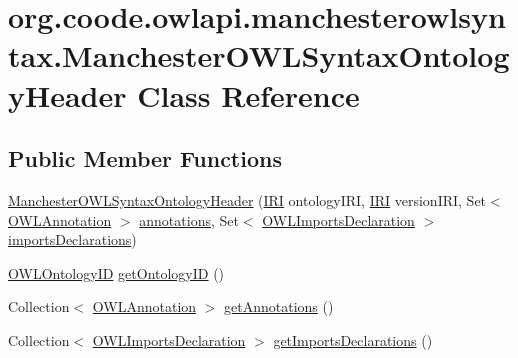 \hypertarget{classorg_1_1coode_1_1owlapi_1_1manchesterowlsyntax_1_1_manchester_o_w_l_syntax_ontology_header}{\section{org.\-coode.\-owlapi.\-manchesterowlsyntax.\-Manchester\-O\-W\-L\-Syntax\-Ontology\-Header Class Reference}
\label{classorg_1_1coode_1_1owlapi_1_1manchesterowlsyntax_1_1_manchester_o_w_l_syntax_ontology_header}
}
\subsection*{Public Member Functions}
\begin{DoxyCompactItemize}
\item 
\hyperlink{classorg_1_1coode_1_1owlapi_1_1manchesterowlsyntax_1_1_manchester_o_w_l_syntax_ontology_header_ae619d477986cc2c2fe97b58c08af132f}{Manchester\-O\-W\-L\-Syntax\-Ontology\-Header} (\hyperlink{classorg_1_1semanticweb_1_1owlapi_1_1model_1_1_i_r_i}{I\-R\-I} ontology\-I\-R\-I, \hyperlink{classorg_1_1semanticweb_1_1owlapi_1_1model_1_1_i_r_i}{I\-R\-I} version\-I\-R\-I, Set$<$ \hyperlink{interfaceorg_1_1semanticweb_1_1owlapi_1_1model_1_1_o_w_l_annotation}{O\-W\-L\-Annotation} $>$ \hyperlink{classorg_1_1coode_1_1owlapi_1_1manchesterowlsyntax_1_1_manchester_o_w_l_syntax_ontology_header_ad912cd8ff52ab96a13e61d653a071bd1}{annotations}, Set$<$ \hyperlink{interfaceorg_1_1semanticweb_1_1owlapi_1_1model_1_1_o_w_l_imports_declaration}{O\-W\-L\-Imports\-Declaration} $>$ \hyperlink{classorg_1_1coode_1_1owlapi_1_1manchesterowlsyntax_1_1_manchester_o_w_l_syntax_ontology_header_af698d9427444ab8ecd5796054ba7a158}{imports\-Declarations})
\item 
\hyperlink{classorg_1_1semanticweb_1_1owlapi_1_1model_1_1_o_w_l_ontology_i_d}{O\-W\-L\-Ontology\-I\-D} \hyperlink{classorg_1_1coode_1_1owlapi_1_1manchesterowlsyntax_1_1_manchester_o_w_l_syntax_ontology_header_ae0b3980e79d1eb24c295a51d41e4d466}{get\-Ontology\-I\-D} ()
\item 
Collection$<$ \hyperlink{interfaceorg_1_1semanticweb_1_1owlapi_1_1model_1_1_o_w_l_annotation}{O\-W\-L\-Annotation} $>$ \hyperlink{classorg_1_1coode_1_1owlapi_1_1manchesterowlsyntax_1_1_manchester_o_w_l_syntax_ontology_header_af2f0bf8fd1869f4b193698e4c0f8a1ff}{get\-Annotations} ()
\item 
Collection$<$ \hyperlink{interfaceorg_1_1semanticweb_1_1owlapi_1_1model_1_1_o_w_l_imports_declaration}{O\-W\-L\-Imports\-Declaration} $>$ \hyperlink{classorg_1_1coode_1_1owlapi_1_1manchesterowlsyntax_1_1_manchester_o_w_l_syntax_ontology_header_aafc3f110722f4ba0075cca4983983b3a}{get\-Imports\-Declarations} ()
\end{DoxyCompactItemize}
